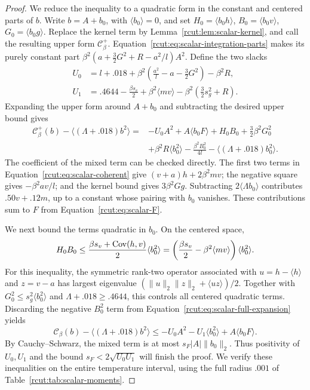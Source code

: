 \begin{proof}
We reduce the inequality to a quadratic form in the constant and
centered parts of \(b\). Write \(b=A+b_0\), with
\(\langle b_0\rangle=0\), and set \(H_0=\langle b_0h\rangle\),
\(B_0=\langle b_0v\rangle\), \(G_0=\langle b_0g\rangle\).
Replace the kernel term by Lemma~\ref{rcut:lem:scalar-kernel}, and call
the resulting upper form \(\mathcal C_\beta^+\).
Equation~\eqref{rcut:eq:scalar-integration-parts} makes its purely constant
part \(\beta^2(a+\tfrac32G^2+R-a^2/l)A^2\). Define the two slacks
\begin{equation}
 \begin{split}
 U_0&=l+.018+\beta^2\left(\frac{a^2}{l}-a-\frac32G^2\right)
                -\beta^2R,\\
 U_1&=.4644-\frac{\beta s_v}{2}+\beta^2\langle mv\rangle
                -\beta^2\left(\frac32s_g^2+R\right).
 \end{split}
 \label{rcut:eq:scalar-slacks}
\end{equation}
Expanding the upper form around \(A+b_0\) and subtracting the desired
upper bound gives
\begin{equation}
 \begin{split}
 \mathcal C_\beta^+(b)-\langle(\Lambda{}+.018)b^2\rangle
 ={}&-U_0A^2+A\langle b_0F\rangle+H_0B_0
       +\frac32\beta^2G_0^2\\
 &+\beta^2R\langle b_0^2\rangle
       -\frac{\beta^2B_0^2}{4l}
       -\langle(\Lambda{}+.018)b_0^2\rangle.
 \end{split}
 \label{rcut:eq:scalar-full-expansion}
\end{equation}
The coefficient of the mixed term can be checked directly.
The first two terms in Equation~\eqref{rcut:eq:scalar-coherent} give
\((v+a)h+2\beta^2mv\); the negative square gives
\(-\beta^2av/l\); and the kernel bound gives \(3\beta^2Gg\).
Subtracting \(2\langle \Lambda{}b_0\rangle\) contributes
\(.50v+.12m\), up to a constant whose pairing with \(b_0\) vanishes.
These contributions sum to \(F\) from Equation~\eqref{rcut:eq:scalar-F}.

We next bound the terms quadratic in \(b_0\). On the centered space,
\[
 H_0B_0\leq\frac{\beta s_v+\operatorname{Cov}(h,v)}2\langle b_0^2\rangle
 =\left(\frac{\beta s_v}{2}-\beta^2\langle mv\rangle\right)
       \langle b_0^2\rangle.
\]
For this inequality, the symmetric rank-two operator associated with
\(u=h-\langle h\rangle\) and \(z=v-a\) has largest eigenvalue
\((\|u\|_2\|z\|_2+\langle uz\rangle)/2\).
Together with \(G_0^2\leq s_g^2\langle b_0^2\rangle\) and
\(\Lambda{}+.018\geq.4644\), this controls all centered quadratic
terms. Discarding the negative \(B_0^2\) term from
Equation~\eqref{rcut:eq:scalar-full-expansion} yields
\begin{equation}
 \mathcal C_\beta(b)-\langle(\Lambda{}+.018)b^2\rangle
 \leq-U_0A^2-U_1\langle b_0^2\rangle+A\langle b_0F\rangle.
 \label{rcut:eq:scalar-two-dimensional}
\end{equation}
By Cauchy--Schwarz, the mixed term is at most
\(s_F|A|\|b_0\|_2\). Thus positivity of \(U_0,U_1\) and the bound
\(s_F<2\sqrt{U_0U_1}\) will finish the proof. We verify these
inequalities on the entire temperature interval, using the full
radius \(.001\) of Table~\ref{rcut:tab:scalar-moments}.


\end{proof}
